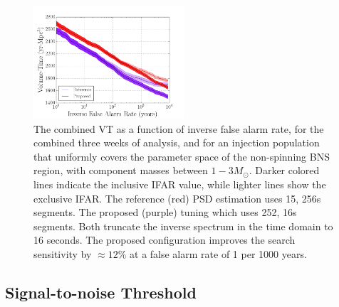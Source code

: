 


\begin{figure}
\centering
\includegraphics[width=0.5\textwidth]{papers/bns_o1_dev/figures/psd_combined.png}
\caption{\label{fig:psd} 
The combined VT as a function of inverse false alarm rate, for the combined three weeks of analysis, and for an injection population that uniformly covers the parameter space of the non-spinning BNS region, with component masses between $1- 3M_\odot$. Darker colored lines indicate the inclusive IFAR value, while lighter lines show the exclusive IFAR. The reference (red) PSD estimation uses 15, 256s segments. The proposed (purple) tuning which uses 252, 16s segments. Both truncate the inverse spectrum in the time domain to 16 seconds. The proposed configuration improves the search sensitivity by $\approx 12\% $ at a false alarm rate of 1 per 1000 years.
}
\end{figure}

\subsection{Signal-to-noise Threshold}
\label{sec:snr}

